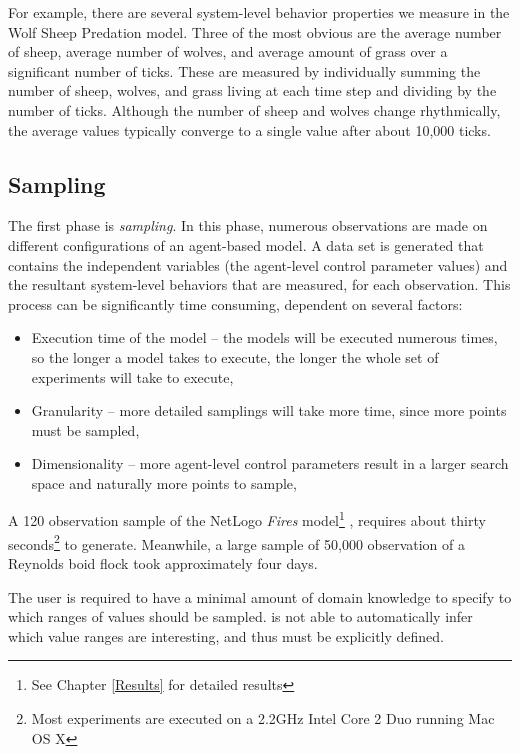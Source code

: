 For example, there are several system-level behavior properties we measure in the Wolf Sheep Predation model.
Three of the most obvious are the average number of sheep, average number of wolves, and average amount of grass over a significant number of ticks.
These are measured by individually summing the number of sheep, wolves, and grass living at each time step and dividing by the number of ticks.
Although the number of sheep and wolves change rhythmically, the average values typically converge to a single value after about 10,000 ticks.

\subsection{Sampling}
The first phase is \textit{sampling}.
In this phase, numerous observations are made on different configurations of an agent-based model.
A data set is generated that contains the independent variables (the agent-level control parameter values) and the resultant system-level behaviors that are measured, for each observation.
This process can be significantly time consuming, dependent on several factors:
\begin{itemize}
  \item Execution time of the model -- the models will be executed numerous times, so the longer a model takes to execute, the longer the whole set of experiments will take to execute,
  \item Granularity -- more detailed samplings will take more time, since more points must be sampled,
  \item Dimensionality -- more agent-level control parameters result in a larger search space and naturally more points to sample,
\end{itemize}
A 120 observation sample of the NetLogo \textit{Fires} model\footnote{See Chapter \ref{Results} for detailed results} \cite{fires}, requires about thirty seconds\footnote{Most experiments are executed on a 2.2GHz Intel Core 2 Duo running Mac OS X} to generate.
Meanwhile, a large sample of 50,000 observation of a Reynolds boid flock \cite{reynolds1987} took approximately four days.

The user is required to have a minimal amount of domain knowledge to specify to \fw which  ranges of values should be sampled.
\fw is not able to automatically infer which value ranges are interesting, and thus must be explicitly defined.

